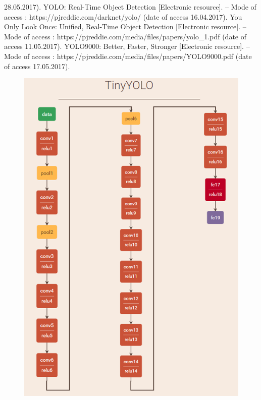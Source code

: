 \documentclass[a4paper,english,russian]{G2-105}
\begin{document}
\begin{thebibliography}{1}
28.05.2017).
     YOLO: Real-Time Object Detection [Electronic resource]. – Mode
of access : https://pjreddie.com/darknet/yolo/ (date of access 16.04.2017).
     You Only Look Once: Unified, Real-Time Object Detection [Electronic resource]. – Mode of access : https://pjreddie.com/media/files/papers/yolo\_1.pdf (date of access 11.05.2017).
     YOLO9000: Better, Faster, Stronger [Electronic resource]. – Mode of access : https://pjreddie.com/media/files/papers/YOLO9000.pdf (date of access 17.05.2017). 
\end{thebibliography}
\begin{figure}
\begin{center}
    \includegraphics[width=0.75\linewidth]{tinyyoloar.png}
\end{center}
\end{figure}
\end{document}
